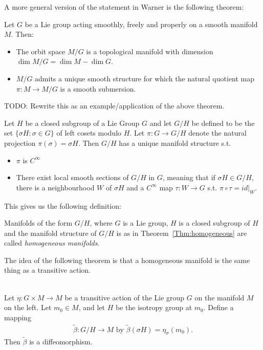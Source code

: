 A more general version of the statement in Warner is the following theorem:
\begin{theorem}
\label{thm:quotient by group action}
Let $G$ be a Lie group acting smoothly, freely and properly on a smooth manifold $M$. Then:
\begin{itemize}
\item The orbit space $M/G$ is a topological manifold with dimension $\dim M/G = \dim M - \dim G$.
\item $M/G$ admits a unique smooth structure for which the natural quotient map $\pi \colon M \to M/G$ is a smooth submersion.
\end{itemize}
\end{theorem}


\begin{example}\label{Thm:homogeneous}
\textup{\cite[3.58]{Warner1983}}
TODO: Rewrite this as an example/application of the above theorem.

Let $H$ be a closed subgroup of a Lie Group $G$ and let $G/H$ be defined to be the set $\{\sigma H \colon \sigma \in G\}$ of left cosets modulo $H$. Let $\pi \colon G \to G/H$ denote the natural projection $\pi(\sigma) = \sigma H$. Then $G/H$ has a unique manifold structure s.t.
\begin{itemize}
\item $\pi$ is $C^{\infty}$
\item There exist local smooth sections of $G/H$ in $G$, meaning that if $\sigma H \in G/H$, there is a neighbourhood $W$ of $\sigma H$ and a $C^{\infty}$ map $\tau \colon W \to G$ s.t. $\pi \circ \tau = id\vert_W$.
\end{itemize}
\end{example}


This gives us the following definition:
\begin{definition} 
\textup{\cite[3.59]{Warner1983}}
Manifolds of the form $G/H$, where $G$ is a Lie group, $H$ is a closed subgroup of $H$ and the manifold structure of $G/H$ is as in Theorem~\ref{Thm:homogeneous} are called \emph{homogeneous manifolds}.
\end{definition}

The idea of the following theorem is that a homogeneous manifold is the same thing as a transitive action.

\begin{theorem}
\label{thm:transitive action homogeneous manifold}
\textup{\cite[3.62]{Warner1983}}\\
Let $\eta \colon G \times M \to M$ be a transitive action of the Lie group $G$ on the manifold $M$ on the left. Let $m_0 \in M$, and let $H$ be the isotropy group at $m_0$. Define a mapping
\begin{align*}
\tilde{\beta} \colon G/H \to M \text{ by } \tilde{\beta}(\sigma H) = \eta_{\sigma}(m_0).
\end{align*}
Then $\tilde{\beta}$ is a diffeomorphism.
\end{theorem}

